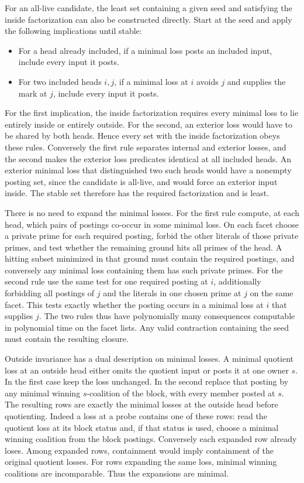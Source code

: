 For an all-live candidate, the least set containing
a given seed and satisfying the inside factorization
can also be constructed directly. Start at the seed
and apply the following implications until stable:
\begin{itemize}
\item For a head already included, if a minimal loss
posts an included input, include every input it posts.
\item For two included heads $i,j$, if a minimal loss
at $i$ avoids $j$ and supplies the mark at $j$, include
every input it posts.
\end{itemize}
For the first implication, the inside factorization
requires every minimal loss to lie entirely inside
or entirely outside. For the second, an exterior
loss would have to be shared by both heads. Hence
every set with the inside factorization obeys these
rules. Conversely the first rule separates internal
and exterior losses, and the second makes the
exterior loss predicates identical at all included
heads. An exterior minimal loss that distinguished
two such heads would have a nonempty posting set,
since the candidate is all-live, and would force
an exterior input inside. The stable set therefore
has the required factorization and is least.

There is no need to expand the minimal losses.
For the first rule compute, at each head, which
pairs of postings co-occur in some minimal loss.
On each facet choose a private prime for each
required posting, forbid the other literals of
those private primes, and test whether the
remaining ground hits all primes of the head.
A hitting subset minimized in that ground must
contain the required postings, and conversely any
minimal loss containing them has such private
primes. For the second rule use the same test
for one required posting at $i$, additionally
forbidding all postings of $j$ and the literals
in one chosen prime at $j$ on the same facet.
This tests exactly whether the posting occurs in
a minimal loss at $i$ that supplies $j$. The two
rules thus have polynomially many consequences
computable in polynomial time on the facet lists.
Any valid contraction containing the seed must
contain the resulting closure.

Outside invariance has a dual description on minimal
losses. A minimal quotient loss at an outside head
either omits the quotient input or posts it at one
owner $s$. In the first case keep the loss unchanged.
In the second replace that posting by any minimal
winning $s$-coalition of the block, with every member
posted at $s$. The resulting rows are exactly the
minimal losses at the outside head before quotienting.
Indeed a loss at a probe contains one of these rows:
read the quotient loss at its block status and, if
that status is used, choose a minimal winning
coalition from the block postings. Conversely each
expanded row already loses. Among expanded rows,
containment would imply containment of the original
quotient losses. For rows expanding the same loss,
minimal winning coalitions are incomparable.
Thus the expansions are minimal.

